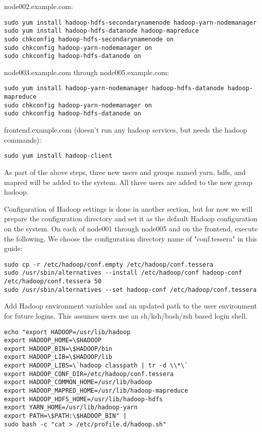 node002.example.com:
\begin{verbatim}
sudo yum install hadoop-hdfs-secondarynamenode hadoop-yarn-nodemanager
sudo yum install hadoop-hdfs-datanode hadoop-mapreduce 
sudo chkconfig hadoop-hdfs-secondarynamenode on
sudo chkconfig hadoop-yarn-nodemanager on
sudo chkconfig hadoop-hdfs-datanode on
\end{verbatim}

node003.example.com through node005.example.com:
\begin{verbatim}
sudo yum install hadoop-yarn-nodemanager hadoop-hdfs-datanode hadoop-mapreduce
sudo chkconfig hadoop-yarn-nodemanager on
sudo chkconfig hadoop-hdfs-datanode on
\end{verbatim}

frontend.example.com (doesn't run any hadoop services, but needs the hadoop commands):
\begin{verbatim}
sudo yum install hadoop-client
\end{verbatim}

As part of the above steps, three new users and groups named yarn, hdfs,
and mapred will be added to the system.  All three users are added to
the new group hadoop.

Configuration of Hadoop settings is done in another section, but for now
we will prepare the configuration directory and set it as the default
Hadoop configuration on the system.  On each of node001 through node005
and on the frontend, execute the following.  We choose the configuration
directory name of "conf.tessera" in this guide:

\begin{verbatim}
sudo cp -r /etc/hadoop/conf.empty /etc/hadoop/conf.tessera
sudo /usr/sbin/alternatives --install /etc/hadoop/conf hadoop-conf /etc/hadoop/conf.tessera 50
sudo /usr/sbin/alternatives --set hadoop-conf /etc/hadoop/conf.tessera
\end{verbatim}

Add Hadoop environment variables and an updated path to the user
environment for future logins.  This assumes users use an sh/ksh/bash/zsh
based login shell.

\begin{verbatim}
echo "export HADOOP=/usr/lib/hadoop
export HADOOP_HOME=\$HADOOP	
export HADOOP_BIN=\$HADOOP/bin
export HADOOP_LIB=\$HADOOP/lib
export HADOOP_LIBS=\`hadoop classpath | tr -d \\*\`
export HADOOP_CONF_DIR=/etc/hadoop/conf.tessera
export HADOOP_COMMON_HOME=/usr/lib/hadoop
export HADOOP_MAPRED_HOME=/usr/lib/hadoop-mapreduce
export HADOOP_HDFS_HOME=/usr/lib/hadoop-hdfs
export YARN_HOME=/usr/lib/hadoop-yarn
export PATH=\$PATH:\$HADOOP_BIN" | 
sudo bash -c "cat > /etc/profile.d/hadoop.sh"
\end{verbatim}

